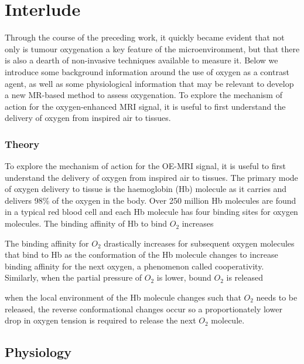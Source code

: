 
\chapter{Interlude}
\label{ch:interlude}
Through the course of the preceding work, it quickly became evident that not only is tumour oxygenation a key feature of the microenvironment, but that there is also a dearth of non-invasive techniques available to measure it.
Below we introduce some background information around the use of oxygen as a contrast agent, as well as some physiological information that may be relevant to develop a new MR-based method to assess oxygenation.
To explore the mechanism of action for the oxygen-enhanced MRI signal, it is useful to first understand the delivery of oxygen from inspired air to tissues.

\subsection{Theory}
To explore the mechanism of action for the OE-MRI signal, it is useful to first understand the delivery of oxygen from inspired air to tissues. 
The primary mode of oxygen delivery to tissue is the haemoglobin (\acs{Hb}) molecule as it carries and delivers 98\% of the oxygen in the body. 
Over 250 million \acs{Hb} molecules are found in a typical red blood cell and each \acs{Hb} molecule has four binding sites for oxygen molecules. 
The binding affinity of \acs{Hb} to bind ${O_2}$ increases 

The binding affinity for ${O_2}$ drastically increases for subsequent oxygen molecules that bind to \acs{Hb} as the conformation of the \acs{Hb} molecule changes to increase binding affinity for the next oxygen, a phenomenon called cooperativity. 
Similarly, when the partial pressure of ${O_2}$ is lower, bound ${O_2}$ is released 

when the local environment of the \acs{Hb} molecule changes such that ${O_2}$ needs to be released, the reverse conformational changes occur so a proportionately lower drop in oxygen tension is required to release the next ${O_2}$ molecule. 

\section{Physiology}

